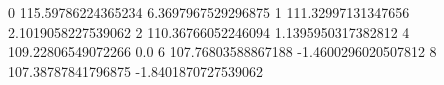 0 115.59786224365234 6.3697967529296875
1 111.32997131347656 2.1019058227539062
2 110.36766052246094 1.1395950317382812
4 109.22806549072266 0.0
6 107.76803588867188 -1.4600296020507812
8 107.38787841796875 -1.8401870727539062
